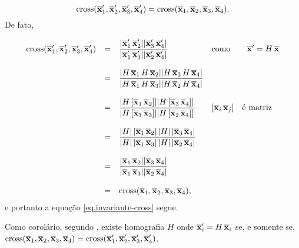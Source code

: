 \begin{equation}\label{eq.invariante-cross}
\text{cross}(\overline{\mathbf{x}}'_1,\overline{\mathbf{x}}'_2,\overline{\mathbf{x}}'_3,\overline{\mathbf{x}}'_4)=\text{cross}(\overline{\mathbf{x}}_1,\overline{\mathbf{x}}_2,\overline{\mathbf{x}}_3,\overline{\mathbf{x}}_4).
\end{equation}
De fato,

\begin{equation*}
\begin{array}{rcll}
\text{cross}(\overline{\mathbf{x}}'_1,\overline{\mathbf{x}}'_2,\overline{\mathbf{x}}'_3,\overline{\mathbf{x}}'_4)&=&\displaystyle\frac{|\overline{\mathbf{x}}'_1\,\overline{\mathbf{x}}'_2||\overline{\mathbf{x}}'_3\,\overline{\mathbf{x}}'_4|}{|\overline{\mathbf{x}}'_1\,\overline{\mathbf{x}}'_3||\overline{\mathbf{x}}'_2\,\overline{\mathbf{x}}'_4|}&\text{como}\qquad\overline{\mathbf{x}}'=H\,\overline{\mathbf{x}}\\\\
&=&
\displaystyle\frac{|H\,\overline{\mathbf{x}}_1\,H\,\overline{\mathbf{x}}_2||H\,\overline{\mathbf{x}}_3\,H\,\overline{\mathbf{x}}_4|}{|H\,\overline{\mathbf{x}}_1\,H\,\overline{\mathbf{x}}_3||H\,\overline{\mathbf{x}}_2\,H\,\overline{\mathbf{x}}_4|}&\\\\
&=&
\displaystyle\frac{|H\,[\overline{\mathbf{x}}_1\,\overline{\mathbf{x}}_2]||H\,[\overline{\mathbf{x}}_3\,\overline{\mathbf{x}}_4]|}{|H\,[\overline{\mathbf{x}}_1\,\overline{\mathbf{x}}_3]||H\,[\overline{\mathbf{x}}_2\,\overline{\mathbf{x}}_4|]}&[\overline{\mathbf{x}}_i\,\overline{\mathbf{x}}_j]\quad\text{é matriz}      \\\\
&=&
\displaystyle\frac{|H|\,|\overline{\mathbf{x}}_1\,\overline{\mathbf{x}}_2|\,|H|\,|\overline{\mathbf{x}}_3\,\overline{\mathbf{x}}_4|}{|H|\,|\overline{\mathbf{x}}_1\,\overline{\mathbf{x}}_3|\,|H|\,|\overline{\mathbf{x}}_2\,\overline{\mathbf{x}}_4|}&\\\\
&=&
\displaystyle\frac{|\overline{\mathbf{x}}_1\,\overline{\mathbf{x}}_2||\overline{\mathbf{x}}_3\,\overline{\mathbf{x}}_4|}{|\overline{\mathbf{x}}_1\,\overline{\mathbf{x}}_3||\overline{\mathbf{x}}_2\,\overline{\mathbf{x}}_4|}&\\\\
&=&
\text{cross}(\overline{\mathbf{x}}_1,\overline{\mathbf{x}}_2,\overline{\mathbf{x}}_3,\overline{\mathbf{x}}_4),
\end{array}
\end{equation*}
e portanto a equação \ref{eq.invariante-cross} segue.

Como corolário, segundo \cite{kneebone}, existe homografia $H$ onde $\overline{\mathbf{x}}'_i=H\,\overline{\mathbf{x}}_i$ se, e somente se, $\text{cross}(\overline{\mathbf{x}}_1,\overline{\mathbf{x}}_2,\overline{\mathbf{x}}_3,\overline{\mathbf{x}}_4)=\text{cross}(\overline{\mathbf{x}}'_1,\overline{\mathbf{x}}'_2,\overline{\mathbf{x}}'_3,\overline{\mathbf{x}}'_4)$. 

